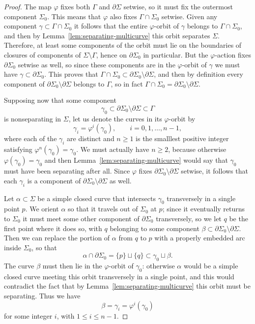 \documentclass[11pt]{amsart}
\numberwithin{equation}{section}
\numberwithin{theorem}{section}
\theoremstyle{definition}
\renewcommand{\phi}{\varphi}
\begin{document}
\begin{proof}
The map $\phi$ fixes both $\Gamma$ and $\partial\Sigma$ setwise, so it must fix the outermost component $\Sigma_0$.  This means that $\phi$ also fixes $\Gamma \cap \Sigma_0$ setwise.  Given any component $\gamma \subset \Gamma \cap \Sigma_0$ it follows that the entire $\phi$-orbit of $\gamma$ belongs to $\Gamma \cap \Sigma_0$, and then by Lemma~\ref{lem:separating-multicurve} this orbit separates $\Sigma$.  Therefore, at least some components of the orbit must lie on the boundaries of closures of components of $\Sigma \setminus \Gamma$, hence on $\partial \Sigma_0$ in particular.  But the $\phi$-action fixes $\partial \Sigma_0$ setwise as well, so since these components are in the $\phi$-orbit of $\gamma$ we must have $\gamma \subset \partial\Sigma_0$.  This proves that $\Gamma \cap \Sigma_0 \subset \partial\Sigma_0 \setminus \partial\Sigma$, and then by definition every component of $\partial\Sigma_0 \setminus \partial\Sigma$ belongs to $\Gamma$, so in fact $\Gamma \cap \Sigma_0 = \partial\Sigma_0 \setminus \partial\Sigma$.

Supposing now that some component
\[ \gamma_0 \subset \partial\Sigma_0 \setminus \partial \Sigma \subset \Gamma \]
is nonseparating in $\Sigma$, let us denote the curves in its $\phi$-orbit by
\[ \gamma_i = \phi^i(\gamma_0), \qquad i=0,1,\dots,n-1, \]
where each of the $\gamma_i$ are distinct and $n \geq 1$ is the smalllest positive integer satisfying $\phi^n(\gamma_0) = \gamma_0$.  We must actually have $n \geq 2$, because otherwise $\phi(\gamma_0) = \gamma_0$ and then Lemma~\ref{lem:separating-multicurve} would say that $\gamma_0$ must have been separating after all.  Since $\phi$ fixes $\partial\Sigma_0 \setminus \partial\Sigma$ setwise, it follows that each $\gamma_i$ is a component of $\partial\Sigma_0 \setminus \partial\Sigma$ as well.  

Let $\alpha \subset \Sigma$ be a simple closed curve that intersects $\gamma_0$ transversely in a single point $p$.  We orient $\alpha$ so that it travels out of $\Sigma_0$ at $p$; since it eventually returns to $\Sigma_0$ it must meet some other component of $\partial\Sigma_0$ transversely, so we let $q$ be the first point where it does so, with $q$ belonging to some component $\beta \subset \partial\Sigma_0 \setminus \partial\Sigma$.  Then we can replace the portion of $\alpha$ from $q$ to $p$ with a properly embedded arc inside $\Sigma_0$, so that
\[ \alpha \cap \partial \Sigma_0 = \{p\} \sqcup \{q\} \subset \gamma_0 \sqcup \beta. \]
The curve $\beta$ must then lie in the $\phi$-orbit of $\gamma_0$: otherwise $\alpha$ would be a simple closed curve meeting this orbit transversely in a single point, and this would contradict the fact that by Lemma~\ref{lem:separating-multicurve} this orbit must be separating.  Thus we have
\[ \beta = \gamma_i = \phi^i(\gamma_0) \]
for some integer $i$, with $1 \leq i \leq n-1$.


\end{proof}
\end{document}
